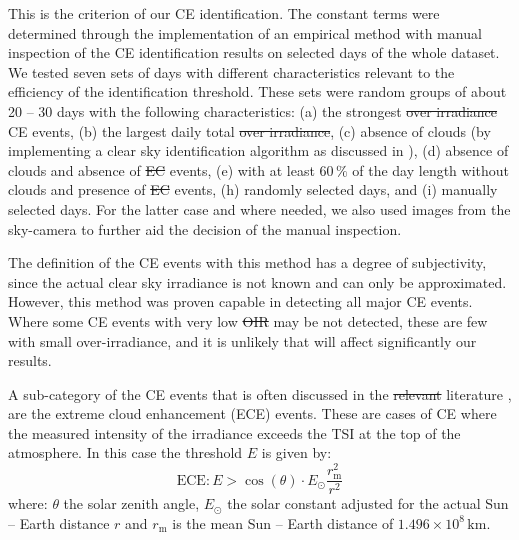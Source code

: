 \documentclass[preprint, 5p,
authoryear]{elsarticle} %
\providecommand{\DIFaddtex}[1]{{\protect\color{blue}\uwave{#1}}} %
\providecommand{\DIFdeltex}[1]{{\protect\color{red}\sout{#1}}}                      %
\providecommand{\DIFaddbegin}{} %
\providecommand{\DIFaddend}{} %
\providecommand{\DIFdelbegin}{} %
\providecommand{\DIFdelend}{} %
\providecommand{\DIFadd}[1]{\texorpdfstring{\DIFaddtex{#1}}{#1}} %
\providecommand{\DIFdel}[1]{\texorpdfstring{\DIFdeltex{#1}}{}} %
\newcommand{\DIFscaledelfig}{0.5}
\newlength{\DIFdelgraphicswidth} %
\newlength{\DIFdelgraphicsheight} %
\newcommand{\DIFaddincludegraphics}[2][]{{\color{blue}\fbox{\DIFOincludegraphics[#1]{#2}}}} %
\newcommand{\DIFdelincludegraphics}[2][]{%
\sbox{\DIFdelgraphicsbox}{\DIFOincludegraphics[#1]{#2}}%
\settoboxwidth{\DIFdelgraphicswidth}{\DIFdelgraphicsbox} %
\settoboxtotalheight{\DIFdelgraphicsheight}{\DIFdelgraphicsbox} %
\scalebox{\DIFscaledelfig}{%
\parbox[b]{\DIFdelgraphicswidth}{\usebox{\DIFdelgraphicsbox}\\[-\baselineskip] \rule{\DIFdelgraphicswidth}{0em}}\llap{\resizebox{\DIFdelgraphicswidth}{\DIFdelgraphicsheight}{%
\setlength{\unitlength}{\DIFdelgraphicswidth}%
\begin{picture}(1,1)%
\thicklines\linethickness{2pt} %
{\color[rgb]{1,0,0}\put(0,0){\framebox(1,1){}}}%
{\color[rgb]{1,0,0}\put(0,0){\line( 1,1){1}}}%
{\color[rgb]{1,0,0}\put(0,1){\line(1,-1){1}}}%
\end{picture}%
}\hspace*{3pt}}} %
} %
\DeclareRobustCommand{\DIFaddbegin}{\DIFOaddbegin \let\includegraphics\DIFaddincludegraphics} %
\DeclareRobustCommand{\DIFaddend}{\DIFOaddend \let\includegraphics\DIFOincludegraphics} %
\DeclareRobustCommand{\DIFdelbegin}{\DIFOdelbegin \let\includegraphics\DIFdelincludegraphics} %
\DeclareRobustCommand{\DIFdelend}{\DIFOaddend \let\includegraphics\DIFOincludegraphics} %
\begin{document}
This is the criterion of our CE identification. The constant terms were
determined through the implementation of an empirical method with manual
inspection of the CE identification results on selected days of the
whole dataset. We tested seven sets of days with different
characteristics relevant to the efficiency of the identification
threshold. These sets were random groups of about 20 -- 30 days with the
following characteristics: (a) the strongest \DIFdelbegin \DIFdel{over irradiance }\DIFdelend \DIFaddbegin \DIFadd{OI }\DIFaddend CE events, (b) the
largest daily total \DIFdelbegin \DIFdel{over irradiance}\DIFdelend \DIFaddbegin \DIFadd{OI}\DIFaddend , (c) absence of clouds (by implementing a clear
sky identification algorithm as discussed in \citet{Natsis2023}), (d)
absence of clouds and absence of \DIFdelbegin \DIFdel{EC }\DIFdelend \DIFaddbegin \DIFadd{CE }\DIFaddend events, (e) with at least \(60\,\%\)
of the day length without clouds and presence of \DIFdelbegin \DIFdel{EC }\DIFdelend \DIFaddbegin \DIFadd{CE }\DIFaddend events, (h) randomly
selected days, and (i) manually selected days. For the latter case and
where needed, we also used images from the sky-camera to further aid the
decision of the manual inspection.

The definition of the CE events with this method has a degree of
subjectivity, since the actual clear sky irradiance is not known and can
only be approximated. However, this method was proven capable in
detecting all major CE events. Where some CE events with very low \DIFdelbegin \DIFdel{OIR
}\DIFdelend \DIFaddbegin \DIFadd{OI }\DIFaddend may
be not detected, these are few with small over-irradiance, and it is
unlikely that will affect significantly our results.

A sub-category of the CE events that is often discussed in the
\DIFdelbegin \DIFdel{relevant
}\DIFdelend literature \citep{Cordero2023, Martins2022, Yordanov2015}, are the
extreme cloud enhancement (ECE) events. These are cases of CE where the
measured intensity of the irradiance exceeds the TSI at the top of the
atmosphere. In this case the threshold \(E\) is given by:
\begin{equation}
\text{ECE}: E > \cos(\theta) \cdot E_{\odot} \frac{r^2_\text{m}}{r^2}
\label{eq:ECE}
\end{equation} where: \(\theta\) the solar zenith angle, \(E_{\odot}\)
the solar constant adjusted for the actual Sun -- Earth distance \(r\)
and \(r_\text{m}\) is the mean Sun -- Earth distance of
\(1.496\times10^8\,\text{km}\).
\end{document}
